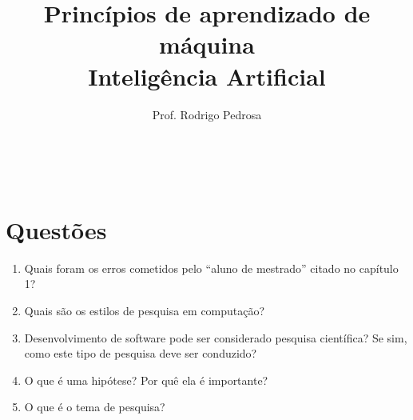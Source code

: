 \documentclass{article}
\title{Princípios de aprendizado de máquina \\ Inteligência Artificial}
\author{Prof. Rodrigo Pedrosa}
\begin{document}
\maketitle

\

\section{Questões}

\begin{enumerate}

    \item Quais foram os erros cometidos pelo ``aluno de mestrado'' citado no capítulo 1?
    
    \item Quais são os estilos de pesquisa em computação?
    
    \item Desenvolvimento de software pode ser considerado pesquisa científica? Se sim, como este tipo de pesquisa deve ser conduzido?
    
    \item O que é uma hipótese? Por quê ela é importante?
    
    \item O que é o tema de pesquisa?
    
\end{enumerate}
    
%
%
\end{document}
